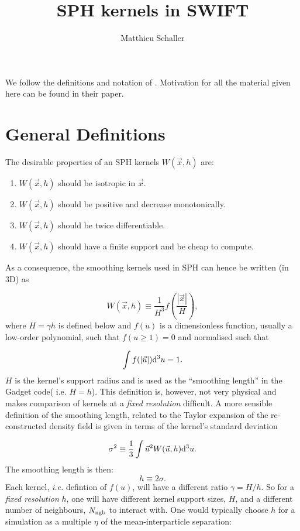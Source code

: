 \documentclass[fleqn, usenatbib, useAMS,a4paper]{mnras}
\title{SPH kernels in SWIFT}
\author{Matthieu Schaller}
\begin{document}
\maketitle

We follow the definitions and notation of
\cite{Dehnen2012}. Motivation for all the material given here can be
found in their paper.

\section{General Definitions}

The desirable properties of an SPH kernels $W(\vec{x},h)$ are:
\begin{enumerate}
\item $W(\vec{x},h)$ should be isotropic in $\vec{x}$.
\item $W(\vec{x},h)$ should be positive and decrease monotonically.
\item $W(\vec{x},h)$ should be twice differentiable.
\item $W(\vec{x},h)$ should have a finite support and be cheap to
  compute.
\end{enumerate}
As a consequence, the smoothing kernels used in SPH can
hence be written (in 3D) as

\begin{equation}
 W(\vec{x},h) \equiv \frac{1}{H^3}f\left(\frac{|\vec{x}|}{H}\right),
\end{equation}
where $H=\gamma h$ is defined below and $f(u)$ is a dimensionless
function, usually a low-order polynomial, such that $f(u \geq 1) = 0$
and normalised such that

\begin{equation}
  \int f(|\vec{u}|){\rm d}^3u = 1.
\end{equation}
$H$ is the kernel's support radius and is used as the ``smoothing
length'' in the Gadget code( {i.e.} $H=h$). This definition is,
however, not very physical and makes comparison of kernels at a
\emph{fixed resolution} difficult. A more sensible definition of the
smoothing length, related to the Taylor expansion of the
re-constructed density field is given in terms of the kernel's
standard deviation

\begin{equation}
  \sigma^2 \equiv \frac{1}{3}\int \vec{u}^2 W(\vec{u},h) {\rm d}^3u.
  \label{eq:sph:sigma}
\end{equation}
The smoothing length is then:
\begin{equation}
  h\equiv2\sigma.
    \label{eq:sph:h}
\end{equation}
Each kernel, {\it i.e.} defintion of $f(u)$, will have a different
ratio $\gamma = H/h$. So for a \emph{fixed resolution} $h$, one will
have different kernel support sizes, $H$, and a different number of
neighbours, $N_{\rm ngb}$ to interact with. One would typically choose
$h$ for a simulation as a multiple $\eta$ of the mean-interparticle
separation:
\end{document}
